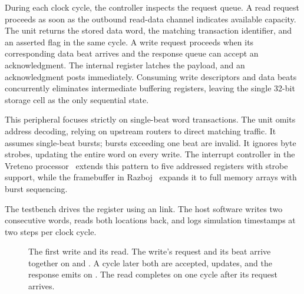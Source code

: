 \documentclass[journal,9pt]{IEEEtran}
\begin{document}


During each clock cycle, the controller inspects the request queue. A read
request proceeds as soon as the outbound read-data channel indicates
available capacity. The unit returns the stored data word, the matching
transaction identifier, and an asserted  flag in the same cycle.
A write request proceeds when its corresponding data beat arrives and the
response queue can accept an acknowledgment. The internal register latches
the payload, and an acknowledgment posts immediately. Consuming write
descriptors and data beats concurrently eliminates intermediate buffering
registers, leaving the single 32-bit storage cell as the only sequential
state.

This peripheral focuses strictly on single-beat word transactions. The unit
omits address decoding, relying on upstream routers to direct matching
traffic. It assumes single-beat bursts; bursts exceeding one beat are
invalid. It ignores byte strobes, updating the entire word on every write.
The interrupt controller in the Vreteno processor~\cite{vreteno} extends
this pattern to five addressed registers with strobe support, while the
framebuffer in Razboj~\cite{gpu} expands it to full memory arrays with burst
sequencing.

The testbench drives the register using an  link. The
host software writes two consecutive words, reads both locations back, and
logs simulation timestamps at two steps per clock cycle.

\begin{figure}[htbp]
\centering

\caption{The first write and its read. The write's request and its
beat arrive together on  and . A cycle later both are
accepted,  updates, and the response emits on .
The read completes on  one cycle after its request arrives.}
\label{fig:a-reg}
\end{figure}


\end{document}
